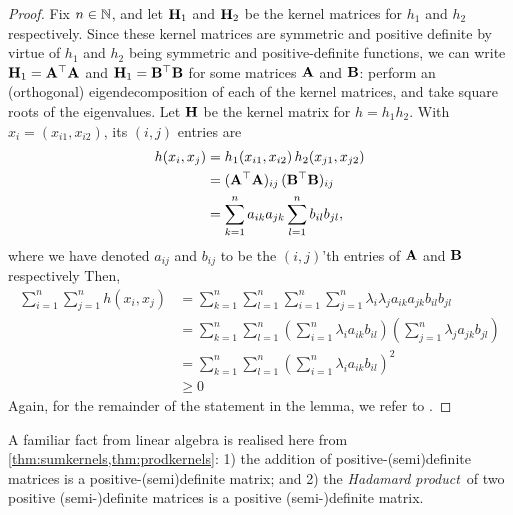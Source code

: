 \begin{proof}
  Fix $n\in\mathbb{N}$, and let ${\mathbf H}_1$ and ${\mathbf H}_2$ be the kernel matrices for $h_1$ and $h_2$ respectively.
  Since these kernel matrices are symmetric and positive definite by virtue of $h_1$ and $h_2$ being symmetric and positive-definite functions, we can write ${\mathbf H}_1 = {\mathbf A}^\top{\mathbf A}$ and ${\mathbf H}_1 = {\mathbf B}^\top{\mathbf B}$ for some matrices ${\mathbf A}$ and ${\mathbf B}$: perform an (orthogonal) eigendecomposition of each of the kernel matrices, and take square roots of the eigenvalues.
  Let ${\mathbf H}$ be the kernel matrix for $h = h_1h_2$.
  With $x_i = (x_{i1}, x_{i2})$, its $(i,j)$ entries are
  \begin{align*}
    h(x_i,x_j)
    &= h_1(x_{i1},x_{i2}) \, h_2(x_{j1},x_{j2}) \\
    &= ({\mathbf A}^\top{\mathbf A})_{ij} \, ({\mathbf B}^\top{\mathbf B})_{ij} \\
    &= \sum_{k=1}^n a_{ik}a_{jk} \sum_{l=1}^n b_{il}b_{jl},
  \end{align*}
  where we have denoted $a_{ij}$ and $b_{ij}$ to be the $(i,j)$'th entries of ${\mathbf A}$ and ${\mathbf B}$ respectively 
  Then,
  \begin{align*}
    \sum_{i=1}^n\sum_{j=1}^n h(x_i,x_j)
    &= \sum_{k=1}^n \sum_{l=1}^n \sum_{i=1}^n \sum_{j=1}^n  \lambda_i \lambda_j a_{ik}a_{jk}b_{il}b_{jl} \\
    &= \sum_{k=1}^n \sum_{l=1}^n \left(\sum_{i=1}^n \lambda_i a_{ik} b_{il} \right) \left( \sum_{j=1}^n  \lambda_j a_{jk}b_{jl} \right) \\
    &= \sum_{k=1}^n \sum_{l=1}^n \left(\sum_{i=1}^n \lambda_i a_{ik} b_{il} \right)^2 \\
    &\geq 0
  \end{align*}
  Again, for the remainder of the statement in the lemma, we refer to \citet[Thm. 13]{berlinet2011reproducing}.
\end{proof}

A familiar fact from linear algebra is realised here from \cref{thm:sumkernels,thm:prodkernels}: 
1) the addition of positive-(semi)definite matrices is a positive-(semi)definite matrix; and 
2) the \emph{Hadamard product}\footnotemark~of two positive (semi-)definite matrices is a positive (semi-)definite matrix.


